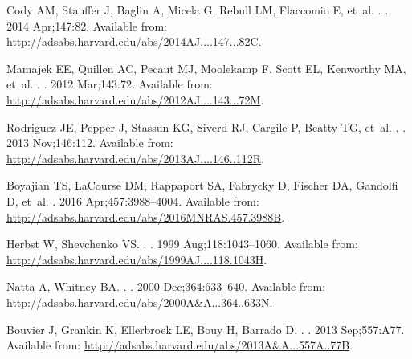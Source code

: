 \documentclass[]{rsos}
\begin{document}
\begin{thebibliography}{10}
{Cody} AM, {Stauffer} J, {Baglin} A, {Micela} G, {Rebull} LM, {Flaccomio} E,
  et~al.
.
\newblock \aj. 2014 Apr;147:82.
\newblock Available from:
  \url{http://adsabs.harvard.edu/abs/2014AJ....147...82C}.

{Mamajek} EE, {Quillen} AC, {Pecaut} MJ, {Moolekamp} F, {Scott} EL, {Kenworthy}
  MA, et~al.
.
\newblock \aj. 2012 Mar;143:72.
\newblock Available from:
  \url{http://adsabs.harvard.edu/abs/2012AJ....143...72M}.

{Rodriguez} JE, {Pepper} J, {Stassun} KG, {Siverd} RJ, {Cargile} P, {Beatty}
  TG, et~al.
.
\newblock \aj. 2013 Nov;146:112.
\newblock Available from:
  \url{http://adsabs.harvard.edu/abs/2013AJ....146..112R}.

{Boyajian} TS, {LaCourse} DM, {Rappaport} SA, {Fabrycky} D, {Fischer} DA,
  {Gandolfi} D, et~al.
\newblock \mnras. 2016 Apr;457:3988--4004.
\newblock Available from:
  \url{http://adsabs.harvard.edu/abs/2016MNRAS.457.3988B}.

{Herbst} W, {Shevchenko} VS.
.
\newblock \aj. 1999 Aug;118:1043--1060.
\newblock Available from:
  \url{http://adsabs.harvard.edu/abs/1999AJ....118.1043H}.

{Natta} A, {Whitney} BA.
.
\newblock \aap. 2000 Dec;364:633--640.
\newblock Available from:
  \url{http://adsabs.harvard.edu/abs/2000A&A...364..633N}.

{Bouvier} J, {Grankin} K, {Ellerbroek} LE, {Bouy} H, {Barrado} D.
.
\newblock \aap. 2013 Sep;557:A77.
\newblock Available from:
  \url{http://adsabs.harvard.edu/abs/2013A&A...557A..77B}.


\end{thebibliography}
\end{document}
